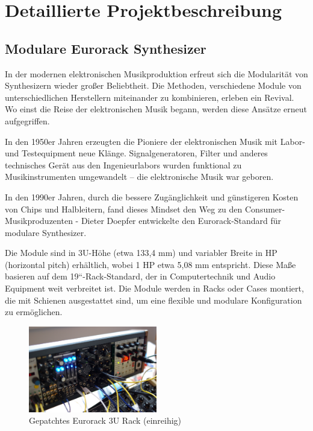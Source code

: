 \newpage
\section{Detaillierte Projektbeschreibung}

	\subsection{Modulare Eurorack Synthesizer}
	
	In der modernen elektronischen Musikproduktion erfreut sich die Modularität von Synthesizern wieder großer Beliebtheit. 
	Die Methoden, verschiedene Module von unterschiedlichen Herstellern miteinander zu kombinieren, erleben ein Revival. \cite{ferguson2015interview}
	Wo einst die Reise der elektronischen Musik begann, werden diese Ansätze erneut aufgegriffen.
	
	In den 1950er Jahren erzeugten die Pioniere der elektronischen Musik mit Labor- und Testequipment neue Klänge. 
	Signalgeneratoren, Filter und anderes technisches Gerät aus den Ingenieurlabors wurden funktional zu Musikinstrumenten umgewandelt – die elektronische Musik war geboren. \cite{holmes2002electronic}
	
	In den 1990er Jahren, durch die bessere Zugänglichkeit und günstigeren Kosten von Chips und Halbleitern, fand dieses Mindset den Weg zu den Consumer-Musikproduzenten - Dieter Doepfer entwickelte den Eurorack-Standard für modulare Synthesizer. \cite{eurorack-standard}
	
	Die Module sind in 3U-Höhe (etwa 133,4 mm) und variabler Breite in HP (horizontal pitch) erhältlich, wobei 1 HP etwa 5,08 mm entspricht. Diese Maße basieren auf dem 19``-Rack-Standard, der in Computertechnik und Audio Equipment weit verbreitet ist. Die Module werden in Racks oder Cases montiert, die mit Schienen ausgestattet sind, um eine flexible und modulare Konfiguration zu ermöglichen. \cite{iec60297-3-108:2014}
	
	
	\begin{figure}[h!]
		\centering
		\includegraphics[width=0.5\textwidth]{images/02_detaillierte-projektbeschr/eurorack-patched}
		\caption{Gepatchtes Eurorack 3U Rack (einreihig)}
		\label{fig:eurorack-patched}
	\end{figure}
	
